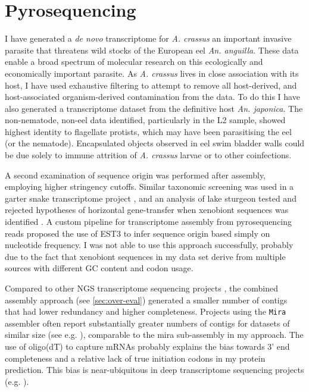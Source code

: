\section{Pyrosequencing}
\label{sec:454-pyr}

I have generated a \textit{de novo} transcriptome for \textit{A. crassus} an
important invasive parasite that threatens wild stocks of the European
eel \textit{An. anguilla}. These data enable a broad spectrum of
molecular research on this ecologically and economically important
parasite. As \textit{A. crassus} lives in close association with its
host, I have used exhaustive filtering to attempt to remove all
host-derived, and host-associated organism-derived contamination from
the data. To do this I have also generated a transcriptome dataset
from the definitive host \textit{An. japonica}. The non-nematode,
non-eel data identified, particularly in the L2 sample, showed highest
identity to flagellate protists, which may have been parasitising the
eel (or the nematode). Encapsulated objects observed in eel swim
bladder walls \cite{heitlinger_massive_2009} could be due solely to
immune attrition of \textit{A. crassus} larvae or to other
coinfections.

A second examination of sequence origin was performed after assembly,
employing higher stringency cutoffs. Similar taxonomic screening was
used in a garter snake transcriptome project \cite{pmid21138572}, and
an analysis of lake sturgeon tested and rejected hypotheses of
horizontal gene-transfer when xenobiont sequences was identified
\cite{pmid20386959}. A custom pipeline for transcriptome assembly from
pyrosequencing reads \cite{pmid20034392} proposed the use of EST3
\cite{pmid17218127} to infer sequence origin based simply on
nucleotide frequency. I was not able to use this approach
successfully, probably due to the fact that xenobiont sequences in my
data set derive from multiple sources with different GC content and
codon usage.

Compared to other NGS transcriptome sequencing projects
\cite{pmid20478048}, the combined assembly approach (see
\ref{sec:over-eval}) generated a smaller number of contigs that had
lower redundancy and higher completeness. Projects using the
\texttt{Mira} assembler often report substantially greater numbers of
contigs for datasets of similar size (see e.g. \cite{pmid21364769}),
comparable to the mira sub-assembly in my approach. The use of
oligo(dT) to capture mRNAs probably explains the bias towards 3' end
completeness and a relative lack of true initiation codons in my
protein prediction. This bias is near-ubiquitous in deep transcriptome
sequencing projects (e.g. \cite{pmid20331785}).

